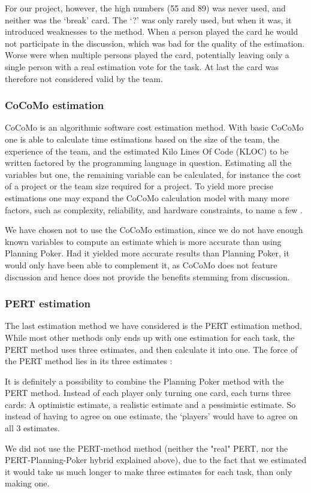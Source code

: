 For our project, however, the high numbers (55 and 89) was never used, and neither was the `break' card. The `?' was only rarely used, but when it was, it introduced weaknesses to the method.
When a person played the card he would not participate in the discussion, which was bad for the quality of the estimation. Worse were when multiple persons played the card, potentially leaving only a single person with a real estimation vote for the task.
At last the card was therefore not considered valid by the team.

\subsubsection{CoCoMo estimation}
CoCoMo is an algorithmic software cost estimation method. With basic CoCoMo one is able to calculate time estimations based on the size of the team, the experience of the team, and the estimated Kilo Lines Of Code (KLOC) to be written factored by the programming language in question.
Estimating all the variables but one, the remaining variable can be calculated, for instance the cost of a project or the team size required for a project. To yield more precise estimations one may expand the CoCoMo calculation model with many more factors, such as complexity, reliability, and hardware constraints, to name a few \cite[p. 147]{PM}.

We have chosen not to use the CoCoMo estimation, since we do not have enough known variables to compute an estimate which is more accurate than using Planning Poker. Had it yielded more accurate results than Planning Poker, it would only have been able to complement it, as CoCoMo does not feature discussion and hence does not provide the benefits stemming from discussion.

\subsubsection{PERT estimation}
The last estimation method we have considered is the PERT estimation method. While most other methods only ends up with one estimation for each task, the PERT method uses three estimates, and then calculate it into one. The force of the PERT method lies in its three estimates \cite[p. 152]{PM}:

It is definitely a possibility to combine the Planning Poker method with the PERT method. Instead of each player only turning one card, each turns three cards: A optimistic estimate, a realistic estimate and a pessimistic estimate. So instead of having to agree on one estimate, the `players' would have to agree on all 3 estimates.

We did not use the PERT-method method (neither the "real" PERT, nor the PERT-Planning-Poker hybrid explained above), due to the fact that we estimated it would take us much longer to make three estimates for each task, than only making one.